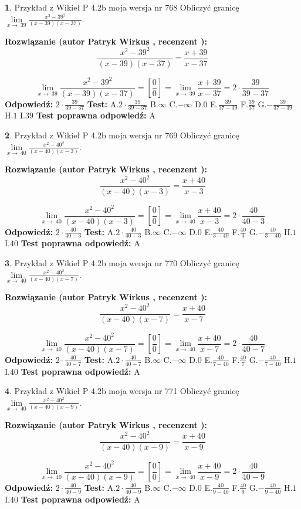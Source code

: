 \documentclass[12pt, a4paper]{article}
\theoremstyle{definition} %
\newtheorem{zad}{}
\newcommand{\zadStart}[1]{\begin{zad}#1\newline}
\newcommand{\zadStop}{\end{zad}}
\newcommand{\rozwStart}[2]{\noindent \textbf{Rozwiązanie (autor #1 , recenzent #2): }\newline}
\newcommand{\rozwStop}{\newline}
\newcommand{\odpStart}{\noindent \textbf{Odpowiedź:}\newline}
\newcommand{\odpStop}{\newline}
\newcommand{\testStart}{\noindent \textbf{Test:}\newline}
\newcommand{\testStop}{\newline}
\newcommand{\kluczStart}{\noindent \textbf{Test poprawna odpowiedź:}\newline}
\newcommand{\kluczStop}{\newline}
\begin{document}
\zadStart{Przykład z Wikieł P 4.2b moja wersja nr 768}
Obliczyć granicę $\lim\limits_{x\to\ 39}\frac{x^{2}-39^{2}}{(x-39)(x-37)}$.
\zadStop
\rozwStart{Patryk Wirkus}{}
$$\frac{x^{2}-39^{2}}{(x-39)(x-37)}=\frac{x+39}{x-37}$$

$$\lim\limits_{x\to\ 39}\frac{x^{2}-39^{2}}{(x-39)(x-37)}=[\frac{0}{0}]=\lim\limits_{x\to\ 39}\frac{x+39}{x-37}=2 \cdot \frac{39}{39-37}$$
\rozwStop
\odpStart
$2 \cdot \frac{39}{39-37}$
\odpStop
\testStart
A.$2 \cdot \frac{39}{39-37}$
B.$\infty$
C.$-\infty$
D.$0$
E.$\frac{39}{37-39}$
F.$\frac{39}{37}$
G.$-\frac{39}{37-39}$
H.$1$
I.$39$
\testStop
\kluczStart
A
\kluczStop



\zadStart{Przykład z Wikieł P 4.2b moja wersja nr 769}
Obliczyć granicę $\lim\limits_{x\to\ 40}\frac{x^{2}-40^{2}}{(x-40)(x-3)}$.
\zadStop
\rozwStart{Patryk Wirkus}{}
$$\frac{x^{2}-40^{2}}{(x-40)(x-3)}=\frac{x+40}{x-3}$$

$$\lim\limits_{x\to\ 40}\frac{x^{2}-40^{2}}{(x-40)(x-3)}=[\frac{0}{0}]=\lim\limits_{x\to\ 40}\frac{x+40}{x-3}=2 \cdot \frac{40}{40-3}$$
\rozwStop
\odpStart
$2 \cdot \frac{40}{40-3}$
\odpStop
\testStart
A.$2 \cdot \frac{40}{40-3}$
B.$\infty$
C.$-\infty$
D.$0$
E.$\frac{40}{3-40}$
F.$\frac{40}{3}$
G.$-\frac{40}{3-40}$
H.$1$
I.$40$
\testStop
\kluczStart
A
\kluczStop



\zadStart{Przykład z Wikieł P 4.2b moja wersja nr 770}
Obliczyć granicę $\lim\limits_{x\to\ 40}\frac{x^{2}-40^{2}}{(x-40)(x-7)}$.
\zadStop
\rozwStart{Patryk Wirkus}{}
$$\frac{x^{2}-40^{2}}{(x-40)(x-7)}=\frac{x+40}{x-7}$$

$$\lim\limits_{x\to\ 40}\frac{x^{2}-40^{2}}{(x-40)(x-7)}=[\frac{0}{0}]=\lim\limits_{x\to\ 40}\frac{x+40}{x-7}=2 \cdot \frac{40}{40-7}$$
\rozwStop
\odpStart
$2 \cdot \frac{40}{40-7}$
\odpStop
\testStart
A.$2 \cdot \frac{40}{40-7}$
B.$\infty$
C.$-\infty$
D.$0$
E.$\frac{40}{7-40}$
F.$\frac{40}{7}$
G.$-\frac{40}{7-40}$
H.$1$
I.$40$
\testStop
\kluczStart
A
\kluczStop



\zadStart{Przykład z Wikieł P 4.2b moja wersja nr 771}
Obliczyć granicę $\lim\limits_{x\to\ 40}\frac{x^{2}-40^{2}}{(x-40)(x-9)}$.
\zadStop
\rozwStart{Patryk Wirkus}{}
$$\frac{x^{2}-40^{2}}{(x-40)(x-9)}=\frac{x+40}{x-9}$$

$$\lim\limits_{x\to\ 40}\frac{x^{2}-40^{2}}{(x-40)(x-9)}=[\frac{0}{0}]=\lim\limits_{x\to\ 40}\frac{x+40}{x-9}=2 \cdot \frac{40}{40-9}$$
\rozwStop
\odpStart
$2 \cdot \frac{40}{40-9}$
\odpStop
\testStart
A.$2 \cdot \frac{40}{40-9}$
B.$\infty$
C.$-\infty$
D.$0$
E.$\frac{40}{9-40}$
F.$\frac{40}{9}$
G.$-\frac{40}{9-40}$
H.$1$
I.$40$
\testStop
\kluczStart
A
\kluczStop
\end{document}
